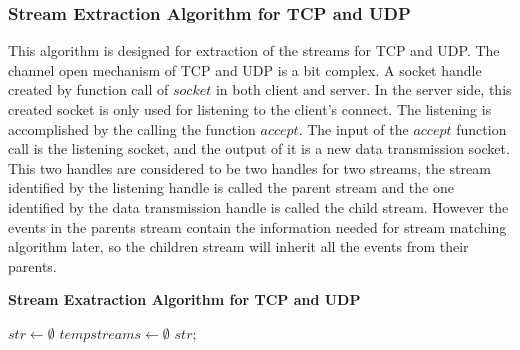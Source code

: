 \subsubsection{Stream Extraction Algorithm for TCP and UDP}
This algorithm is designed for extraction of the streams for TCP and UDP. The channel open mechanism of TCP and UDP is a bit complex. A socket handle created by function call of $socket$ in both client and server. In the server side, this created socket is only used for listening to the client's connect. The listening is accomplished by the calling the function $accept$. The input of the $accept$ function call is the listening socket, and the output of it is a new data transmission socket. This two handles are considered to be two handles for two streams, the stream identified by the listening handle is called the parent stream and the one identified by the data transmission handle is called the child stream. However the events in the parents stream contain the information needed for stream matching algorithm later, so the children stream will inherit all the events from their parents. 
\begin{algorithm}[H]
\DontPrintSemicolon
\caption{{\bf Stream Exatraction Algorithm for TCP and UDP} \label{streamext2}}
$str \leftarrow \emptyset$\; 
$tempstreams \leftarrow \emptyset$\;
\KwRet $str$;\;
\end{algorithm} 

